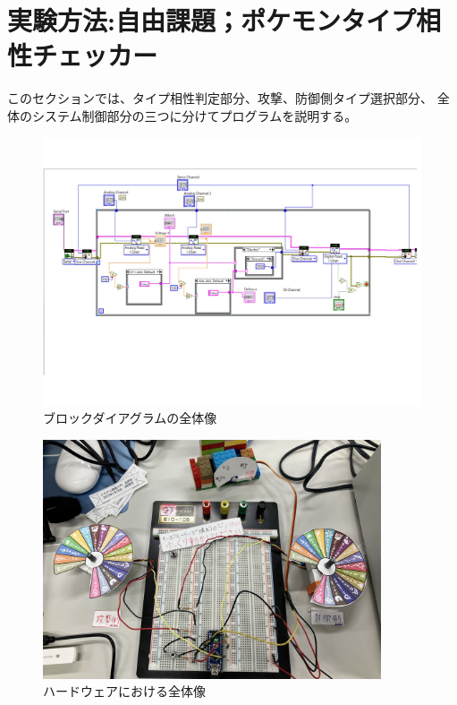 \documentclass[a4paper,titlepage,11pt]{ltjsarticle}
\begin{document}
\section{実験方法:自由課題；ポケモンタイプ相性チェッカー}
このセクションでは、タイプ相性判定部分、攻撃、防御側タイプ選択部分、
全体のシステム制御部分の三つに分けてプログラムを説明する。
\begin{figure}[H]
  \begin{center}
    \includegraphics[width=150mm]{selfmade_b.pdf}
    \caption{ブロックダイアグラムの全体像}
  \end{center}
\end{figure}
\begin{figure}[H]
  \begin{center}
    \includegraphics[width=100mm]{selfmade_h1.pdf}
    \caption{ハードウェアにおける全体像}
  \end{center}
\end{figure}
\end{document}
